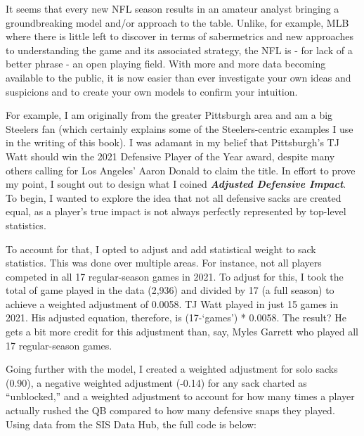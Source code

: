 \documentclass[
  letterpaper,
]{krantz}
\begin{document}
It seems that every new NFL season results in an amateur analyst
bringing a groundbreaking model and/or approach to the table. Unlike,
for example, MLB where there is little left to discover in terms of
sabermetrics and new approaches to understanding the game and its
associated strategy, the NFL is - for lack of a better phrase - an open
playing field. With more and more data becoming available to the public,
it is now easier than ever investigate your own ideas and suspicions and
to create your own models to confirm your intuition.

For example, I am originally from the greater Pittsburgh area and am a
big Steelers fan (which certainly explains some of the Steelers-centric
examples I use in the writing of this book). I was adamant in my belief
that Pittsburgh's TJ Watt should win the 2021 Defensive Player of the
Year award, despite many others calling for Los Angeles' Aaron Donald to
claim the title. In effort to prove my point, I sought out to design
what I coined \textbf{\emph{Adjusted Defensive Impact}}. To begin, I
wanted to explore the idea that not all defensive sacks are created
equal, as a player's true impact is not always perfectly represented by
top-level statistics.

To account for that, I opted to adjust and add statistical weight to
sack statistics. This was done over multiple areas. For instance, not
all players competed in all 17 regular-season games in 2021. To adjust
for this, I took the total of game played in the data (2,936) and
divided by 17 (a full season) to achieve a weighted adjustment of
0.0058. TJ Watt played in just 15 games in 2021. His adjusted equation,
therefore, is (17-`games') * 0.0058. The result? He gets a bit more
credit for this adjustment than, say, Myles Garrett who played all 17
regular-season games.

Going further with the model, I created a weighted adjustment for solo
sacks (0.90), a negative weighted adjustment (-0.14) for any sack
charted as ``unblocked,'' and a weighted adjustment to account for how
many times a player actually rushed the QB compared to how many
defensive snaps they played. Using data from the SIS Data Hub, the full
code is below:
\end{document}
